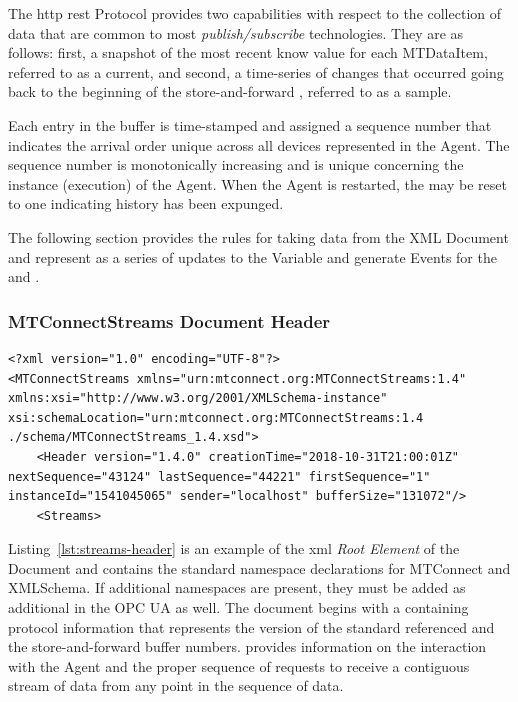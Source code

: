 The \gls{http} \gls{rest} Protocol provides two capabilities with respect to the collection of data that are common to most \textit{publish/subscribe} technologies. They are as follows: first, a snapshot of the most recent know value for each \gls{MTDataItem}, referred to as a \gls{current}, and second, a time-series of changes that occurred going back to the beginning of the store-and-forward , referred to as a \gls{sample}.

Each entry in the \gls{buffer} is time-stamped and assigned a sequence number that indicates the arrival order unique across all devices represented in the \gls{Agent}. The sequence number is monotonically increasing and is unique concerning the instance (execution) of the \gls{Agent}. When the \gls{Agent} is restarted, the  may be reset to one indicating history has been expunged. 

The following section provides the rules for taking data from the  XML Document and represent as a series of updates to the \gls{Variable} and generate \glspl{Event} for the  and  .

\subsubsection{MTConnectStreams Document Header}

\begin{lstlisting}[firstnumber=1,escapechar=|,%
    caption={Streams Header},label={lst:streams-header}]
<?xml version="1.0" encoding="UTF-8"?>
<MTConnectStreams xmlns="urn:mtconnect.org:MTConnectStreams:1.4" xmlns:xsi="http://www.w3.org/2001/XMLSchema-instance" xsi:schemaLocation="urn:mtconnect.org:MTConnectStreams:1.4 ./schema/MTConnectStreams_1.4.xsd">
	<Header version="1.4.0" creationTime="2018-10-31T21:00:01Z" nextSequence="43124" lastSequence="44221" firstSequence="1" instanceId="1541045065" sender="localhost" bufferSize="131072"/>
	<Streams>
\end{lstlisting}

Listing~\ref{lst:streams-header} is an example of the \gls{xml} \textit{Root Element} of the  Document and contains the standard namespace declarations for MTConnect and XMLSchema. If additional namespaces are present, they must be added as additional  in the OPC UA  as well. The  document begins with a  containing protocol information that represents the version of the standard referenced and the store-and-forward \gls{buffer}  numbers. \cite{MTCPart1} provides information on the interaction with the \gls{Agent} and the proper sequence of requests to receive a contiguous stream of data from any point in the sequence of data.

